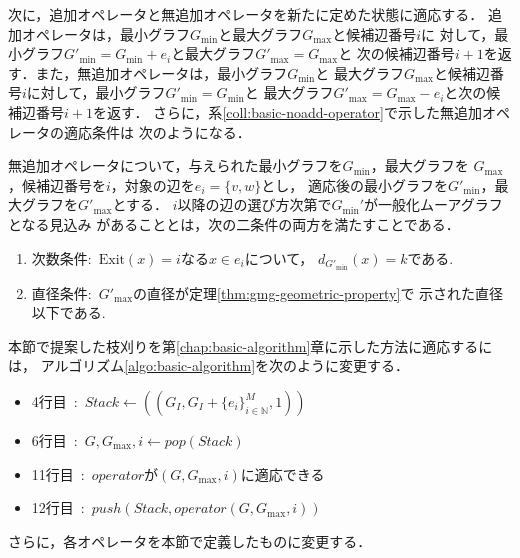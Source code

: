 次に，追加オペレータと無追加オペレータを新たに定めた状態に適応する．
追加オペレータは，最小グラフ$G_{\min}$と最大グラフ$G_{\max}$と候補辺番号$i$に
対して，最小グラフ$G'_{\min}=G_{\min}+e_i$と最大グラフ$G'_{\max}=G_{\max}$と
次の候補辺番号$i+1$を返す．また，無追加オペレータは，最小グラフ$G_{\min}$と
最大グラフ$G_{\max}$と候補辺番号$i$に対して，最小グラフ$G'_{\min}=G_{\min}$と
最大グラフ$G'_{\max}=G_{\max}-e_i$と次の候補辺番号$i+1$を返す．
さらに，系\ref{coll:basic-noadd-operator}で示した無追加オペレータの適応条件は
次のようになる．
\begin{corollary-without-proof}
  \label{coll:minmax-noadd-operator}
  \rm
  無追加オペレータについて，与えられた最小グラフを$G_{\min}$，最大グラフを
  $G_{\max}$，候補辺番号を$i$，対象の辺を$e_i=\{v,w\}$とし，
  適応後の最小グラフを$G'_{\min}$，最大グラフを$G'_{\max}$とする．
  $i$以降の辺の選び方次第で$G_{\min}'$が一般化ムーアグラフとなる見込み
  があることとは，次の二条件の両方を満たすことである．
  \begin{enumerate}
  \item 次数条件:\ $\text{Exit}(x)=i$なる$x\in e_i$について，
    $d_{G'_{\min}}(x)=k$である.
  \item 直径条件:\ $G'_{\max}$の直径が定理\ref{thm:gmg-geometric-property}で
    示された直径以下である.
  \end{enumerate}
\end{corollary-without-proof}

本節で提案した枝刈りを第\ref{chap:basic-algorithm}章に示した方法に適応するには，
アルゴリズム\ref{algo:basic-algorithm}を次のように変更する．
\begin{itemize}
\item 4行目\ :\ $Stack\gets((G_I,G_I+\{e_i\}^M_{i\in\mathbb{N}},1))$
\item 6行目\ :\ $G,G_{\max},i\gets pop(Stack)$
\item 11行目\ :\ $operator$が$(G,G_{\max},i)$に適応できる
\item 12行目\ :\ $push(Stack,operator(G,G_{\max},i))$
\end{itemize}
さらに，各オペレータを本節で定義したものに変更する．

